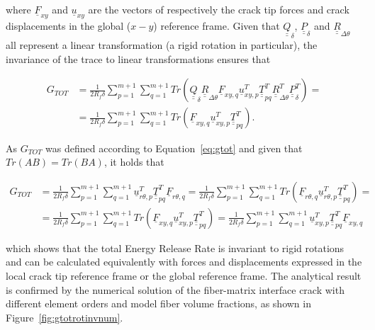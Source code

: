 \documentclass[review]{elsarticle}
\begin{document}
where $\underline{F}_{xy}$ and $\underline{u}_{xy}$ are the vectors of respectively the crack tip forces and crack displacements in the global ($x-y$) reference frame. Given that $\underline{\underline{Q}}_{\delta}$, $\underline{\underline{P}}_{\delta}$ and $\underline{\underline{R}}_{\Delta\theta}$ all represent a linear transformation (a rigid rotation in particular), the invariance of the trace to linear transformations ensures that

\begin{equation}\label{eq:gtotlong2}
\begin{split}
G_{TOT}&=\frac{1}{2R_{f}\delta}\sum_{p=1}^{m+1}\sum_{q=1}^{m+1}Tr\left(\underline{\underline{Q}}_{\delta}\underline{\underline{R}}_{\Delta\theta}\underline{F}_{xy,q}\underline{u}_{xy,p}^{T}\underline{\underline{T}}_{pq}^{T}\underline{\underline{R}}_{\Delta\theta}^{T}\underline{\underline{P}}_{\delta}^{T}\right)=\\
&=\frac{1}{2R_{f}\delta}\sum_{p=1}^{m+1}\sum_{q=1}^{m+1}Tr\left(\underline{F}_{xy,q}\underline{u}_{xy,p}^{T}\underline{\underline{T}}_{pq}^{T}\right).
\end{split}
\end{equation}

As $G_{TOT}$ was defined according to Equation~\ref{eq:gtot} and given that $Tr\left(AB\right)=Tr\left(BA\right)$, it holds that 

\begin{equation}\label{eq:gtotrotinv}
\begin{split}
G_{TOT} &= \frac{1}{2R_{f}\delta}\sum_{p=1}^{m+1}\sum_{q=1}^{m+1}\underline{u}_{r\theta,p}^{T}\underline{\underline{T}}_{pq}^{T}\underline{F}_{r\theta,q}=\frac{1}{2R_{f}\delta}\sum_{p=1}^{m+1}\sum_{q=1}^{m+1}Tr\left(\underline{F}_{r\theta,q}\underline{u}_{r\theta,p}^{T}\underline{\underline{T}}_{pq}^{T}\right)=\\
&=\frac{1}{2R_{f}\delta}\sum_{p=1}^{m+1}\sum_{q=1}^{m+1}Tr\left(\underline{F}_{xy,q}\underline{u}_{xy,p}^{T}\underline{\underline{T}}_{pq}^{T}\right)=\frac{1}{2R_{f}\delta}\sum_{p=1}^{m+1}\sum_{q=1}^{m+1}\underline{u}_{xy,p}^{T}\underline{\underline{T}}_{pq}^{T}\underline{F}_{xy,q}
\end{split}
\end{equation}

which shows that the total Energy Release Rate is invariant to rigid rotations and can be calculated equivalently with forces and displacements expressed in the local crack tip reference frame or the global reference frame. The analytical result is confirmed by the numerical solution of the fiber-matrix interface crack with different element orders and model fiber volume fractions, as shown in Figure~\ref{fig:gtotrotinvnum}.
\end{document}
